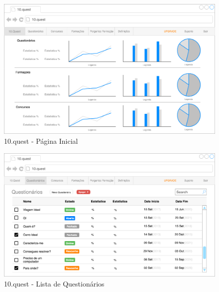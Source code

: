 \begin{figure}[ht!]
	\begin{center}
		\includegraphics[width=1\textwidth]{img/prototipos/3.png}
		\caption{10.quest - Página Inicial}
		\label{10q-dashboard}
	\end{center}
\end{figure}

\begin{figure}[ht!]
	\begin{center}
		\includegraphics[width=1\textwidth]{img/prototipos/4.png}
		\caption{10.quest - Lista de Questionários }
		\label{10q-}
	\end{center}
\end{figure}

